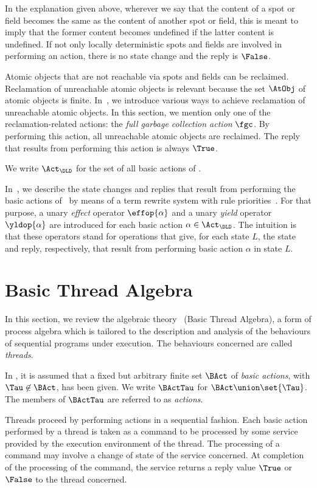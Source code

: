 \documentclass[fleqn]{llncs}
\begin{document}
In the explanation given above, wherever we say that the content of a
spot or field becomes the same as the content of another spot or field,
this is meant to imply that the former content becomes undefined if the
latter content is undefined.
If not only locally deterministic spots and fields are involved in
performing an action, there is no state change and the reply is
$\False$.

Atomic objects that are not reachable via spots and fields can be
reclaimed.
Reclamation of unreachable atomic objects is relevant because the set
$\AtObj$ of atomic objects is finite.
In~\cite{BM08d}, we introduce various ways to achieve reclamation of
unreachable atomic objects.
In this section, we mention only one of the reclamation-related actions:
the \emph{full garbage collection action} $\fgc$.
By performing this action, all unreachable atomic objects are reclaimed.
The reply that results from performing this action is always $\True$.

We write $\Act_\DLD$ for the set of all basic actions of \DLD.

In~\cite{BM08d}, we describe the state changes and replies that result
from performing the basic actions of \DLD\ by means of a term rewrite
system with rule priorities~\cite{BBKW89a}.
For that purpose, a unary \emph{effect} operator $\effop{\alpha}$ and a
unary \emph{yield} operator $\yldop{\alpha}$ are introduced for each
basic action $\alpha \in \Act_\DLD$.
The intuition is that these operators stand for operations that give,
for each state $L$, the state and reply, respectively, that result from
performing basic action $\alpha$ in state $L$.

\section{Basic Thread Algebra}
\label{sect-BTA}

In this section, we review the algebraic theory \BTA\ (Basic Thread
Algebra), a form of process algebra which is tailored to the description
and analysis of the behaviours of sequential programs under execution.
The behaviours concerned are called \emph{threads}.

In \BTA, it is assumed that a fixed but arbitrary finite set $\BAct$ of
\emph{basic actions}, with $\Tau \not\in \BAct$, has been given.
We write $\BActTau$ for $\BAct \union \set{\Tau}$.
The members of $\BActTau$ are referred to as \emph{actions}.

Threads proceed by performing actions in a sequential fashion.
Each basic action performed by a thread is taken as a command to be
processed by some service provided by the execution environment of the
thread.
The processing of a command may involve a change of state of the service
concerned.
At completion of the processing of the command, the service returns a
reply value $\True$ or $\False$ to the thread concerned.
\end{document}
